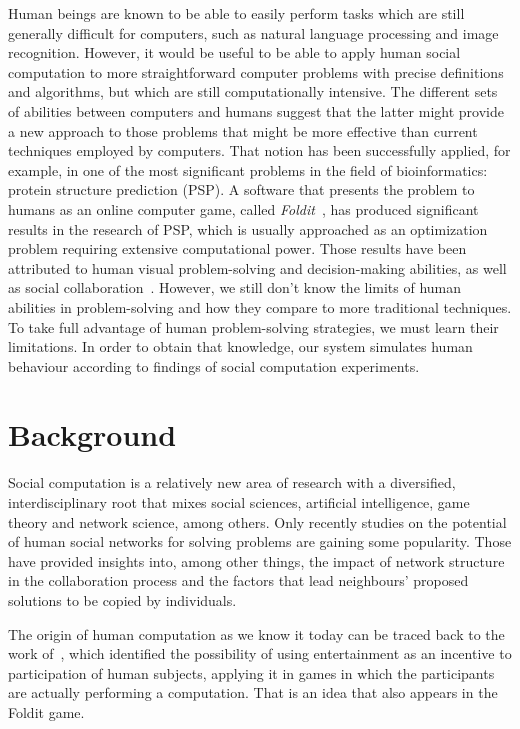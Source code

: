 \documentclass{article}
\begin{document}
Human beings are known to be able to easily perform tasks which are still generally difficult for computers, such as natural language processing and image recognition. However, it would be useful to be able to apply human social computation to more straightforward computer problems with precise definitions and algorithms, but which are still computationally intensive. The different sets of abilities between computers and humans suggest that the latter might provide a new approach to those problems that might be more effective than current techniques employed by computers. That notion has been successfully applied, for example, in one of the most significant problems in the field of bioinformatics: protein structure prediction (PSP). A software that presents the problem to humans as an online computer game, called \emph{Foldit}~\cite{cooper:foldit}, has produced significant results in the research of PSP, which is usually approached as an optimization problem requiring extensive computational power. Those results have been attributed to human visual problem-solving and decision-making abilities, as well as social collaboration~\cite{cooper:foldit}. However, we still don't know the limits of human abilities in problem-solving and how they compare to more traditional techniques. To take full advantage of human problem-solving strategies, we must learn their limitations. In order to obtain that knowledge, our system simulates human behaviour according to findings of social computation experiments.

\section{Background}

Social computation is a relatively new area of research with a diversified, interdisciplinary root that mixes social sciences, artificial intelligence, game theory and network science, among others. Only recently studies on the potential of human social networks for solving problems are gaining some popularity. Those have provided insights into, among other things, the impact of network structure in the collaboration process and the factors that lead neighbours' proposed solutions to be copied by individuals.

The origin of human computation as we know it today can be traced back to the work of~\cite{vonahm:gwap}, which identified the possibility of using entertainment as an incentive to participation of human subjects, applying it in games in which the participants are actually performing a computation. That is an idea that also appears in the Foldit game.
\end{document}
